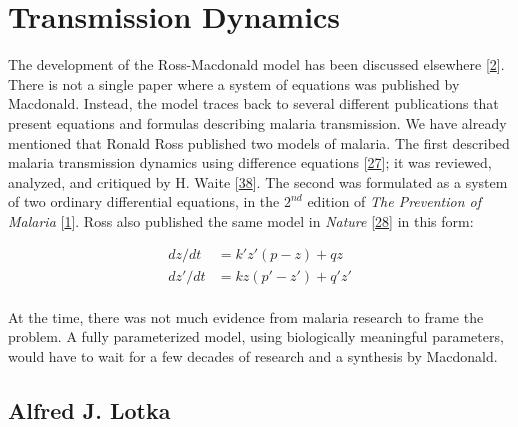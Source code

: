 \documentclass[
]{book}
\begin{document}
\hypertarget{transmission-dynamics}{%
\section{Transmission Dynamics}\label{transmission-dynamics}}

The development of the Ross-Macdonald model has been discussed elsewhere {[}\protect\hyperlink{ref-SmithDL2012_RossMacdonald}{2}{]}. There is not a single paper where a system of equations was published by Macdonald. Instead, the model traces back to several different publications that present equations and formulas describing malaria transmission. We have already mentioned that Ronald Ross published two models of malaria. The first described malaria transmission dynamics using difference equations {[}\protect\hyperlink{ref-RossR1908}{27}{]}; it was reviewed, analyzed, and critiqued by H. Waite {[}\protect\hyperlink{ref-WaiteH1910MosquitoesMalaria}{38}{]}. The second was formulated as a system of two ordinary differential equations, in the \(2^{nd}\) edition of \emph{The Prevention of Malaria} {[}\protect\hyperlink{ref-RossR1911Book}{1}{]}. Ross also published the same model in \emph{Nature} {[}\protect\hyperlink{ref-RossR1911Nature}{28}{]} in this form:

\[ 
\begin{array}{rl}
dz/dt &= k' z' (p-z) + q z \\
dz'/dt &= k z (p'-z') + q' z' \\
\end{array}
\]

At the time, there was not much evidence from malaria research to frame the problem. A fully parameterized model, using biologically meaningful parameters, would have to wait for a few decades of research and a synthesis by Macdonald.

\hypertarget{alfred-j.-lotka}{%
\subsection{Alfred J. Lotka}\label{alfred-j.-lotka}}
\end{document}
